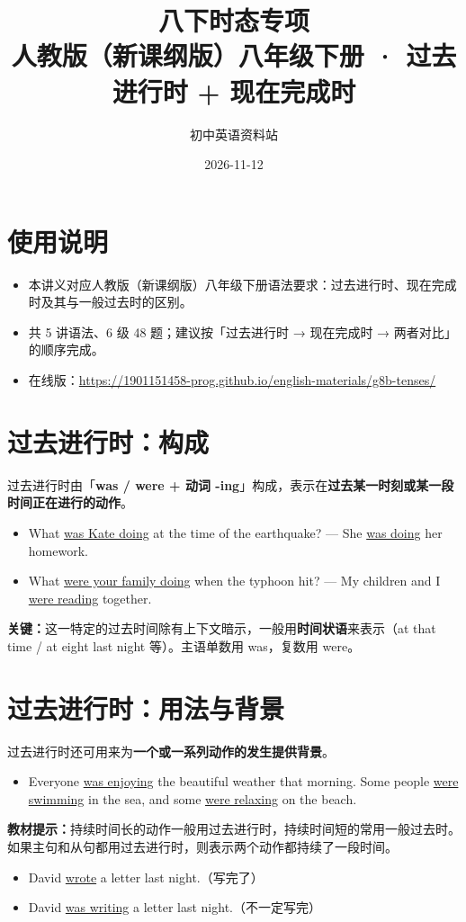 \documentclass[11pt,a4paper]{ctexart}
\title{\textbf{八下时态专项}\\[4pt]
\large 人教版（新课纲版）八年级下册 · 过去进行时 + 现在完成时}
\author{初中英语资料站}
\date{2026-11-12}
\begin{document}
\maketitle

\section*{使用说明}
\begin{itemize}[leftmargin=1.4em]
\item 本讲义对应人教版（新课纲版）八年级下册语法要求：过去进行时、现在完成时及其与一般过去时的区别。
\item 共 5 讲语法、6 级 48 题；建议按「过去进行时 → 现在完成时 → 两者对比」的顺序完成。
\item 在线版：\url{https://1901151458-prog.github.io/english-materials/g8b-tenses/}
\end{itemize}

\section{过去进行时：构成}
过去进行时由「\textbf{was / were + 动词 -ing}」构成，表示在\textbf{过去某一时刻或某一段时间正在进行的动作}。
\begin{itemize}[leftmargin=1.4em]
\item What \underline{was Kate doing} at the time of the earthquake? --- She \underline{was doing} her homework.
\item What \underline{were your family doing} when the typhoon hit? --- My children and I \underline{were reading} together.
\end{itemize}
\textbf{关键：}这一特定的过去时间除有上下文暗示，一般用\textbf{时间状语}来表示（at that time / at eight last night 等）。主语单数用 was，复数用 were。

\section{过去进行时：用法与背景}
过去进行时还可用来为\textbf{一个或一系列动作的发生提供背景}。
\begin{itemize}[leftmargin=1.4em]
\item Everyone \underline{was enjoying} the beautiful weather that morning. Some people \underline{were swimming} in the sea, and some \underline{were relaxing} on the beach.
\end{itemize}
\textbf{教材提示：}持续时间长的动作一般用过去进行时，持续时间短的常用一般过去时。如果主句和从句都用过去进行时，则表示两个动作都持续了一段时间。
\begin{itemize}[leftmargin=1.4em]
\item David \underline{wrote} a letter last night.（写完了）
\item David \underline{was writing} a letter last night.（不一定写完）
\end{itemize}
\end{document}
